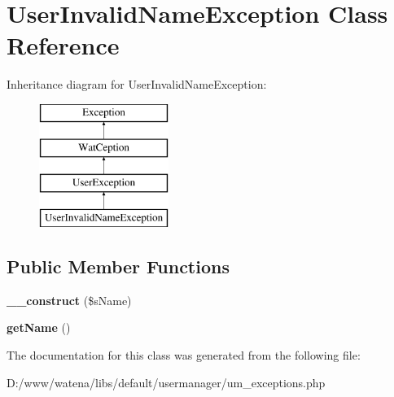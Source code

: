 \hypertarget{class_user_invalid_name_exception}{\section{User\-Invalid\-Name\-Exception Class Reference}
\label{class_user_invalid_name_exception}
}
Inheritance diagram for User\-Invalid\-Name\-Exception\-:\begin{figure}[H]
\begin{center}
\leavevmode
\includegraphics[height=4.000000cm]{class_user_invalid_name_exception}
\end{center}
\end{figure}
\subsection*{Public Member Functions}
\begin{DoxyCompactItemize}
\item 
\hypertarget{class_user_invalid_name_exception_a38f415001b6ccc85ba23bbfb4812fefe}{{\bfseries \-\_\-\-\_\-construct} (\$s\-Name)}\label{class_user_invalid_name_exception_a38f415001b6ccc85ba23bbfb4812fefe}

\item 
\hypertarget{class_user_invalid_name_exception_a6c1be0c0146b74b20b5952e2fc2b0e5c}{{\bfseries get\-Name} ()}\label{class_user_invalid_name_exception_a6c1be0c0146b74b20b5952e2fc2b0e5c}

\end{DoxyCompactItemize}


The documentation for this class was generated from the following file\-:\begin{DoxyCompactItemize}
\item 
D\-:/www/watena/libs/default/usermanager/um\-\_\-exceptions.\-php\end{DoxyCompactItemize}
